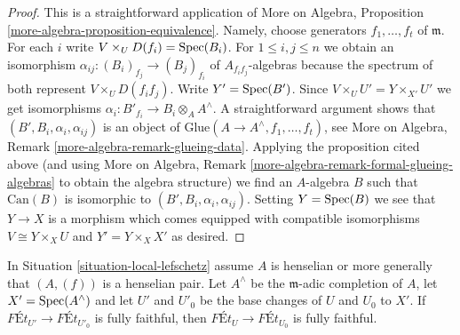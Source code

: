 \begin{proof}
This is a straightforward application of
More on Algebra, Proposition \ref{more-algebra-proposition-equivalence}.
Namely, choose generators $f_1, \ldots, f_t$ of $\mathfrak m$.
For each $i$ write $V \times_U D(f_i) = \mathop{\mathrm{Spec}}(B_i)$.
For $1 \leq i, j \leq n$ we obtain an isomorphism
$\alpha_{ij} : (B_i)_{f_j} \to (B_j)_{f_i}$ of $A_{f_if_j}$-algebras
because the spectrum of both represent $V \times_U D(f_if_j)$.
Write $Y' = \mathop{\mathrm{Spec}}(B')$. Since $V \times_U U' = Y \times_{X'} U'$
we get isomorphisms $\alpha_i : B'_{f_i} \to B_i \otimes_A A^\wedge$.
A straightforward argument shows that $(B', B_i, \alpha_i, \alpha_{ij})$
is an object of $\text{Glue}(A \to A^\wedge, f_1, \ldots, f_t)$, see
More on Algebra, Remark \ref{more-algebra-remark-glueing-data}.
Applying the proposition cited above (and using
More on Algebra, Remark \ref{more-algebra-remark-formal-glueing-algebras}
to obtain the algebra structure) we find an $A$-algebra $B$ such that
$\text{Can}(B)$ is isomorphic to $(B', B_i, \alpha_i, \alpha_{ij})$.
Setting $Y = \mathop{\mathrm{Spec}}(B)$ we see that $Y \to X$ is a morphism
which comes equipped with compatible isomorphisms
$V \cong Y \times_X U$ and $Y' = Y \times_X X'$ as desired.
\end{proof}

\begin{lemma}
\label{lemma-fully-faithful-henselian-completion}
In Situation \ref{situation-local-lefschetz} assume $A$ is henselian
or more generally that $(A, (f))$ is a henselian pair.
Let $A^\wedge$ be the $\mathfrak m$-adic completion of $A$,
let $X' = \mathop{\mathrm{Spec}}(A^\wedge)$ and let $U'$ and $U'_0$ be the base changes of
$U$ and $U_0$ to $X'$. If $\textit{F\'Et}_{U'} \to \textit{F\'Et}_{U'_0}$
is fully faithful, then $\textit{F\'Et}_U \to \textit{F\'Et}_{U_0}$
is fully faithful.
\end{lemma}

